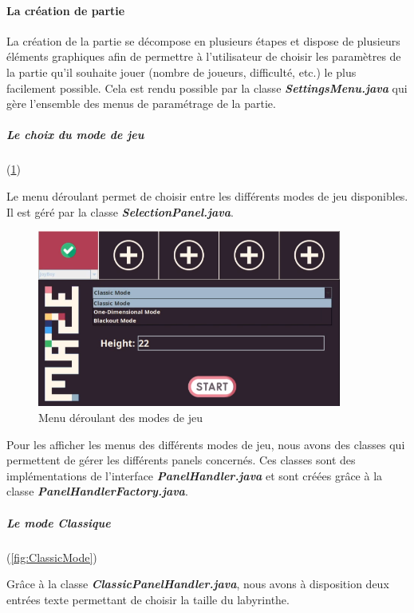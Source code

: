 \paragraph{La création de partie}

La création de la partie se décompose en plusieurs étapes et dispose de plusieurs éléments graphiques afin de permettre à l'utilisateur de choisir les paramètres de la partie qu'il souhaite jouer (nombre de joueurs, difficulté, etc.) le plus facilement possible. Cela est rendu possible par la classe \textbf{\textit{SettingsMenu.java}} qui gère l'ensemble des menus de paramétrage de la partie.

\subparagraph*{Le choix du mode de jeu} (\ref{fig:ModeSelection})

Le menu déroulant permet de choisir entre les différents modes de jeu disponibles. Il est géré par la classe \textbf{\textit{SelectionPanel.java}}.

\begin{figure}[h!]
    \centering
    \includegraphics[width=10cm]{ressources/Implementation/Labyrinthe/Controleur/SettingsMenu_ModeList.png}%
    \caption{Menu déroulant des modes de jeu}
    \label{fig:ModeSelection}
\end{figure}
\FloatBarrier

Pour les afficher les menus des différents modes de jeu, nous avons des classes qui permettent de gérer les différents panels concernés. Ces classes sont des implémentations de l'interface  \textbf{\textit{PanelHandler.java}} et sont créées grâce à la classe  \textbf{\textit{PanelHandlerFactory.java}}.

\subparagraph*{Le mode Classique} (\ref{fig:ClassicMode})

Grâce à la classe \textbf{\textit{ClassicPanelHandler.java}}, nous avons à disposition deux entrées texte permettant de choisir la taille du labyrinthe.

